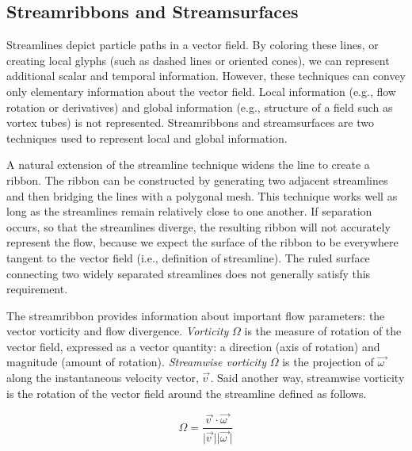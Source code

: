 \subsection{Streamribbons and Streamsurfaces}

Streamlines depict particle paths in a vector field. By coloring these lines, or creating local glyphs (such as dashed lines or oriented cones), we can represent additional scalar and temporal information. However, these techniques can convey only elementary information about the vector field. Local information (e.g., flow rotation or derivatives) and global information (e.g., structure of a field such as vortex tubes) is not represented. Streamribbons and streamsurfaces are two techniques used to represent local and global information.

A natural extension of the streamline technique widens the line to create a ribbon. The ribbon can be constructed by generating two adjacent streamlines and then bridging the lines with a polygonal mesh. This technique works well as long as the streamlines remain relatively close to one another. If separation occurs, so that the streamlines diverge, the resulting ribbon will not accurately represent the flow, because we expect the surface of the ribbon to be everywhere tangent to the vector field (i.e., definition of streamline). The ruled surface connecting two widely separated streamlines does not generally satisfy this requirement.

The streamribbon provides information about important flow parameters: the vector vorticity and flow divergence. \emph{Vorticity} $\Omega$ is the measure of rotation of the vector field, expressed as a vector quantity: a direction (axis of rotation) and magnitude (amount of rotation). \emph{Streamwise vorticity} $\Omega$ is the projection of $\overrightarrow{\omega\ }$ along the instantaneous velocity vector, $\overrightarrow{v\ }$. Said another way, streamwise vorticity is the rotation of the vector field around the streamline defined as follows.

\begin{equation}\label{eq:9.3}
\Omega = \frac{\overrightarrow{v\ } \cdot \overrightarrow{\omega\ }}{\vert \overrightarrow{v\ } \vert \vert \overrightarrow{\omega\ } \vert}
\end{equation}

